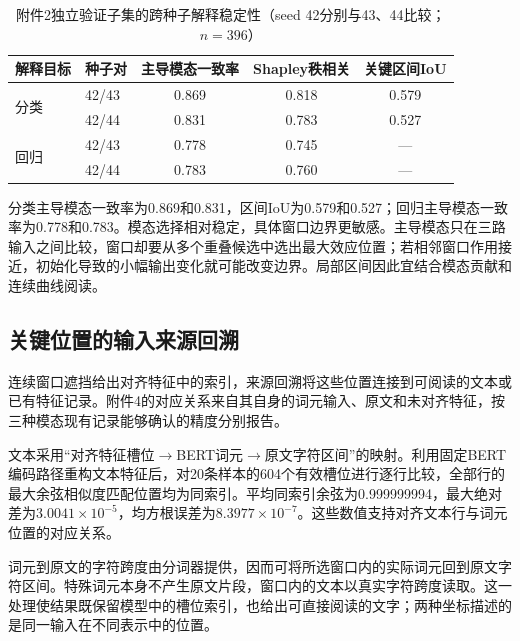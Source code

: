 \documentclass[UTF8,a4paper,12pt]{ctexart}
\newcommand{\QThreeParagraph}{\par\noindent\hspace*{2em}}
\begin{document}
\begin{table}[H]
\centering\small
\setlength{\tabcolsep}{4pt}
\caption{附件2独立验证子集的跨种子解释稳定性（seed 42分别与43、44比较；$n=396$）}
\label{tab:q3_seed_stability}
\begin{tabular}{@{}llccc@{}}
\toprule
\QThreeParagraph 解释目标 & 种子对 & 主导模态一致率 & Shapley秩相关 & 关键区间IoU\\
\midrule
\multirow{2}{*}{分类} & 42/43 & 0.869 & 0.818 & 0.579\\
 & 42/44 & 0.831 & 0.783 & 0.527\\
\multirow{2}{*}{回归} & 42/43 & 0.778 & 0.745 & ---\\
 & 42/44 & 0.783 & 0.760 & ---\\
\bottomrule
\end{tabular}
\par\vspace{2pt}{\footnotesize 秩相关为逐样本三模态Shapley贡献的Spearman系数均值。分类仅统计两种子预测类别一致的样本；IoU为主导模态相同时的区间交并比，模态不同时记为0；回归未单独定义关键区间。}
\end{table}

\QThreeParagraph 分类主导模态一致率为0.869和0.831，区间IoU为0.579和0.527；回归主导模态一致率为0.778和0.783。模态选择相对稳定，具体窗口边界更敏感。主导模态只在三路输入之间比较，窗口却要从多个重叠候选中选出最大效应位置；若相邻窗口作用接近，初始化导致的小幅输出变化就可能改变边界。局部区间因此宜结合模态贡献和连续曲线阅读。

\subsection{关键位置的输入来源回溯}\label{subsec:q3_grounding}
\QThreeParagraph 连续窗口遮挡给出对齐特征中的索引，来源回溯将这些位置连接到可阅读的文本或已有特征记录。附件4的对应关系来自其自身的词元输入、原文和未对齐特征，按三种模态现有记录能够确认的精度分别报告。

\QThreeParagraph 文本采用“对齐特征槽位$\rightarrow$BERT词元$\rightarrow$原文字符区间”的映射。利用固定BERT编码路径重构文本特征后，对20条样本的604个有效槽位进行逐行比较，全部行的最大余弦相似度匹配位置均为同索引。平均同索引余弦为0.999999994，最大绝对差为$3.0041\times10^{-5}$，均方根误差为$8.3977\times10^{-7}$。这些数值支持对齐文本行与词元位置的对应关系。

\QThreeParagraph 词元到原文的字符跨度由分词器提供，因而可将所选窗口内的实际词元回到原文字符区间。特殊词元本身不产生原文片段，窗口内的文本以真实字符跨度读取。这一处理使结果既保留模型中的槽位索引，也给出可直接阅读的文字；两种坐标描述的是同一输入在不同表示中的位置。
\end{document}
